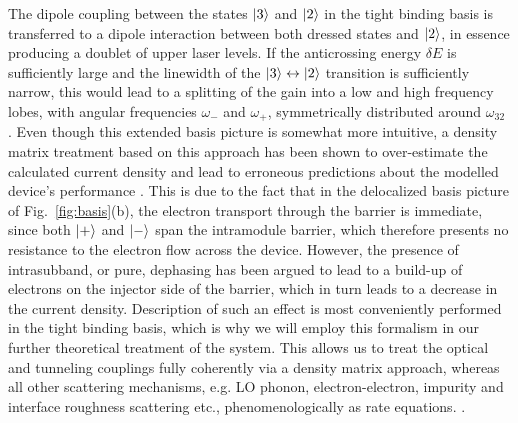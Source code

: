 \documentclass[journal]{IEEEtran}
\begin{document}
	The dipole coupling between the states $\ket{3}$ and $\ket{2}$ in the tight binding basis is transferred to a dipole interaction between both dressed states and $\ket{2}$, in essence producing a doublet of upper laser levels. If the anticrossing energy $\delta E$ is sufficiently large and the linewidth of the $\ket{3}\leftrightarrow\ket{2}$ transition is sufficiently narrow, this would lead to a splitting of the gain into a low and high frequency lobes, with angular frequencies $\omega_{-}$ and $\omega_{+}$, symmetrically distributed around $\omega_{32}$ \cite{dupont2010simplified}. Even though this extended basis picture is somewhat more intuitive, a density matrix treatment based on this approach has been shown to over-estimate the calculated current density and lead to erroneous predictions about the modelled device's performance \cite{callebaut2005importance}. This is due to the fact that in the delocalized basis picture of Fig.~\ref{fig:basis}(b), the electron transport through the barrier is immediate, since both $\ket{+}$ and $\ket{-}$ span the intramodule barrier, which therefore presents no resistance to the electron flow across the device. However, the presence of intrasubband, or pure, dephasing has been argued to lead to a build-up of electrons on the injector side of the barrier, which in turn leads to a decrease in the current density. Description of such an effect is most conveniently performed in the tight binding basis, which is why we will employ this formalism in our further theoretical treatment of the system. This allows us to treat the optical and tunneling couplings fully coherently via a density matrix approach, whereas all other scattering mechanisms, e.g. LO phonon, electron-electron, impurity and interface roughness scattering etc., phenomenologically as rate equations. \cite{kumar2009coherence}. 
	
\end{document}
